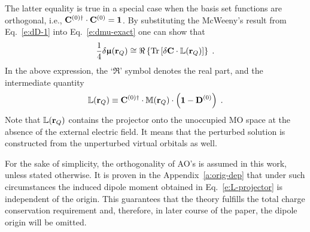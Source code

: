 \documentclass[aip,jcp,preprint,amsmath,amssymb,floatfix]{revtex4-1}
\newcommand{\BM}[1]{\bm{#1}}
\DeclareMathOperator{\Tr}{Tr}
\begin{document}
%
The latter equality is true in a special case when the basis set functions are orthogonal, i.e., 
${\bf C}^{(0)\dagger} \cdot {\bf C}^{(0)}={\bf 1}$.
By substituting the McWeeny's result from Eq.~\eqref{e:dD-1}
into Eq.~\eqref{e:dmu-exact} one can show that
%
%
\begin{equation}\label{e:dmu-l-vector}
 \frac{1}{4} 
 \delta {\BM{\upmu}}({\bf r}_Q)
  \cong
  \Re \left\{ 
 \Tr{ 
    \left[ 
         \delta {\bf C} \cdot \mathbb{L}({\bf r}_Q)
   \right] }  
  \right\} \;.
\end{equation}
%
In the above expression, the `$\Re$' symbol denotes the real part,
and the intermediate quantity
%
\begin{equation} \label{e:L-projector}
 \mathbb{L}({\bf r}_Q) \equiv {\bf C}^{(0)\dagger} \cdot \mathbb{M}({\bf r}_Q) \cdot \left( {\bf 1} - {\bf D}^{(0)} \right) \;.
\end{equation}
%
Note that $\mathbb{L}({\bf r}_Q)$ contains the projector onto
the unoccupied MO space at the absence of the external electric field. It means that the
perturbed solution is constructed from the unperturbed virtual orbitals as well.

For the sake of simplicity, 
the orthogonality of AO's is assumed in this work, unless stated otherwise.
It is proven in the Appendix~\ref{a:orig-dep} that under such circumstances the
induced dipole moment obtained in Eq.~\eqref{e:L-projector} is independent of the origin. 
This guarantees that the theory fulfills the total charge conservation requirement and,
therefore, in later course of the paper, the dipole origin will be omitted. 
\end{document}
